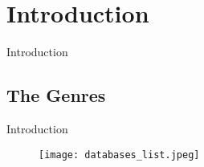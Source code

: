 \chapter{Introduction}

Introduction

\section{The Genres}

Introduction

\begin{figure}[hb]
  \centering
  \texttt{[image: databases\_list.jpeg]}
\end{figure}